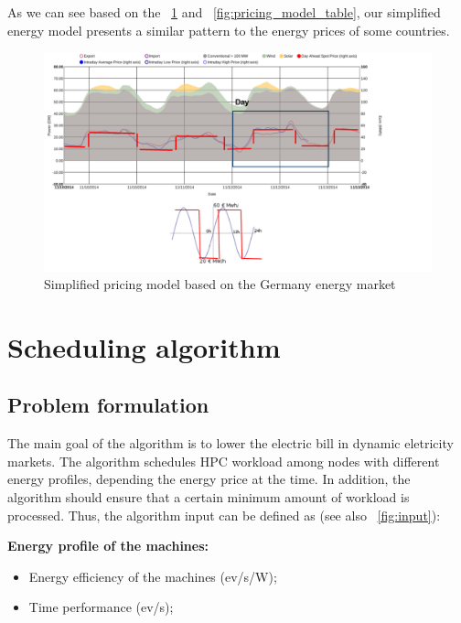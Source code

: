 As we can see based on the ~\ref{fig:pricing_model} and ~\ref{fig:pricing_model_table}, our simplified energy model presents a similar pattern to the energy prices of some countries.

\begin{figure}[h]
  \centering
    \includegraphics[width=150mm]{"img/pricing_model"}
    \caption{Simplified pricing model based on the Germany energy market}
    \label{fig:pricing_model}
\end{figure}

\section{Scheduling algorithm}

\subsection*{Problem formulation}

The main goal of the algorithm is to lower the electric bill in dynamic eletricity markets. The algorithm schedules HPC workload among nodes with different energy profiles, depending the energy price at the time. In addition, the algorithm should ensure that a certain minimum amount of workload is processed. Thus, the algorithm input can be defined as (see also ~\ref{fig:input}): 

\vspace{10mm}

\textbf{Energy profile of the machines:}
\begin{itemize}
  \item[] Energy efficiency of the machines (ev/s/W);
  \item[] Time performance (ev/s);
\end{itemize}

